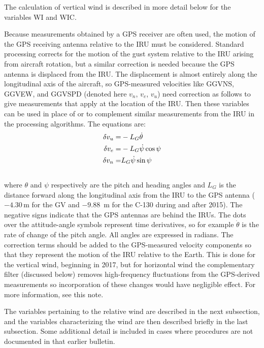 \documentclass[
  english,
]{book}
\begin{document}
The calculation of vertical wind is described in more detail below for the variables WI and WIC.

Because measurements obtained by a GPS receiver are often used, the motion of the GPS receiving antenna relative to the IRU must be considered. Standard processing corrects for the motion of the gust system relative to the IRU arising from aircraft rotation, but a similar correction is needed because the GPS antenna is displaced from the IRU. The displacement is almost entirely along the longitudinal axis of the aircraft, so GPS-measured velocities like GGVNS, GGVEW, and GGVSPD (denoted here \(v_n\), \(v_e\), \(v_u\)) need correction as follows to give measurements that apply at the location of the IRU. Then these variables can be used in place of or to complement similar measurements from the IRU in the processing algorithms. The equations are:\\
\begin{align}\begin{split}
\delta v_{u} = & -L_{G}\dot{\theta}\notag \\
\delta v_{e} = & -L_{G}\dot{\psi}\,{\cos\psi}\notag \\
\delta v_{n} = &  L_{G}\dot{\psi}\,{\sin\psi}
\end{split}
\label{eq:deltav}
\end{align}\\
where \(\theta\) and \(\psi\) respectively are the pitch and heading angles and \(L_G\) is the distance forward along the longitudinal axis from the IRU to the GPS antenna (\(−4.30\) m for the GV and \(-9.88\)~m for the C-130 during and after 2015). The negative signs indicate that the GPS antennas are behind the IRUs. The dots over the attitude-angle symbols represent time derivatives, so for example \(\dot{\theta}\) is the rate of change of the pitch angle. All angles are expressed in radians. The correction terms should be added to the GPS-measured velocity components so that they represent the motion of the IRU relative to the Earth. This is done for the vertical wind, beginning in 2017, but for horizontal wind the complementary filter (discussed below) removes high-frequency fluctuations from the GPS-derived measurements so incorporation of these changes would have negligible effect. For more information, see this note.

The variables pertaining to the relative wind are described in the next subsection, and the variables characterizing the wind are then described briefly in the last subsection. Some additional detail is included in cases where procedures are not documented in that earlier bulletin.
\end{document}
